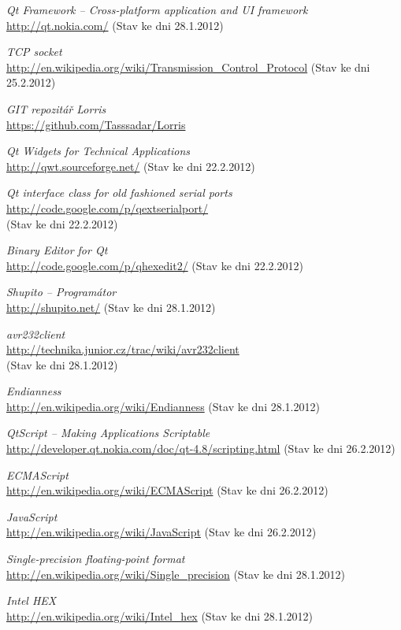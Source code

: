 \documentclass[12pt, a4paper, oneside]{article}
\newcommand{\It}{\textit}  %
\begin{document}
\newpage
{}
 \begin{thebibliography}{99}
     \It{Qt Framework -- Cross-platform application and UI framework} \\
    \url{http://qt.nokia.com/} (Stav ke dni 28.1.2012)

     \It{TCP socket} \\
    \url{http://en.wikipedia.org/wiki/Transmission_Control_Protocol} (Stav ke dni 25.2.2012)

     \It{GIT repozitář Lorris} \\
    \url{https://github.com/Tasssadar/Lorris}

     \It{Qt Widgets for Technical Applications} \\
    \url{http://qwt.sourceforge.net/} (Stav ke dni 22.2.2012)

     \It{Qt interface class for old fashioned serial ports} \\
    \url{http://code.google.com/p/qextserialport/} \\
    (Stav ke dni 22.2.2012)

     \It{Binary Editor for Qt} \\
    \url{http://code.google.com/p/qhexedit2/} (Stav ke dni 22.2.2012)
    
     \It{Shupito -- Programátor} \\
    \url{http://shupito.net/} (Stav ke dni 28.1.2012)

     \It{avr232client} \\
    \url{http://technika.junior.cz/trac/wiki/avr232client}\\
    (Stav ke dni 28.1.2012)

     \It{Endianness} \\
    \url{http://en.wikipedia.org/wiki/Endianness} (Stav ke dni 28.1.2012)

     \It{QtScript -- Making Applications Scriptable} \\
    \url{http://developer.qt.nokia.com/doc/qt-4.8/scripting.html} (Stav ke dni 26.2.2012)

     \It{ECMAScript} \\
    \url{http://en.wikipedia.org/wiki/ECMAScript} (Stav ke dni 26.2.2012)

     \It{JavaScript} \\
    \url{http://en.wikipedia.org/wiki/JavaScript} (Stav ke dni 26.2.2012)

     \It{Single-precision floating-point format} \\
    \url{http://en.wikipedia.org/wiki/Single_precision} (Stav ke dni 28.1.2012)

     \It{Intel HEX} \\
    \url{http://en.wikipedia.org/wiki/Intel_hex} (Stav ke dni 28.1.2012)
\end{thebibliography}
\end{document}
